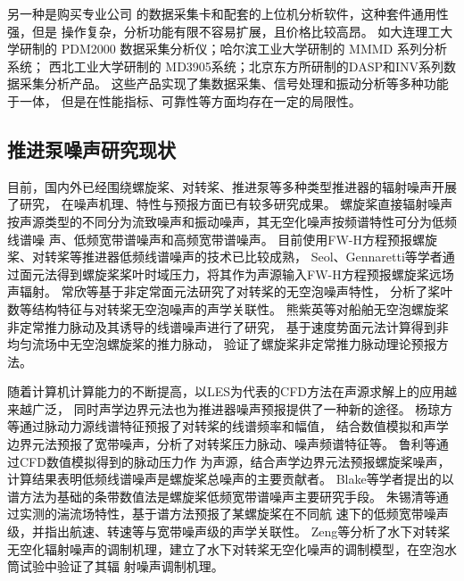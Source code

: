 另一种是购买专业公司
的数据采集卡和配套的上位机分析软件，这种套件通用性强，但是
操作复杂，分析功能有限不容易扩展，且价格比较高昂。
如大连理工大学研制的 PDM2000 数据采集分析仪；哈尔滨工业大学研制的 MMMD 系列分析系统；
西北工业大学研制的 MD3905系统；北京东方所研制的DASP和INV系列数据采集分析产品\cite{dingJi2014}。
这些产品实现了集数据采集、信号处理和振动分析等多种功能于一体，
但是在性能指标、可靠性等方面均存在一定的局限性。

\subsection{推进泵噪声研究现状}
目前，国内外已经围绕螺旋桨、对转桨、推进泵等多种类型推进器的辐射噪声开展了研究，
在噪声机理、特性与预报方面已有较多研究成果。
螺旋桨直接辐射噪声按声源类型的不同分为流致噪声和振动噪声，其无空化噪声按频谱特性可分为低频线谱噪
声、低频宽带谱噪声和高频宽带谱噪声\cite{cheng2019,xuye2019a}。
目前使用FW-H方程预报螺旋桨、对转桨等推进器低频线谱噪声的技术已比较成熟，
Seol、Gennaretti等学者通过面元法得到螺旋桨桨叶时域压力，将其作为声源输入FW-H方程预报螺旋桨远场声辐射\cite{seol2002,gennaretti2012}。
常欣等\cite{changxin2018}基于非定常面元法研究了对转桨的无空泡噪声特性，
分析了桨叶数等结构特征与对转桨无空泡噪声的声学关联性。
熊紫英等\cite{xiong2014}对船舶无空泡螺旋桨非定常推力脉动及其诱导的线谱噪声进行了研究，
基于速度势面元法计算得到非均匀流场中无空泡螺旋桨的推力脉动，
验证了螺旋桨非定常推力脉动理论预报方法。

随着计算机计算能力的不断提高，以LES为代表的CFD方法在声源求解上的应用越来越广泛，
同时声学边界元法也为推进器噪声预报提供了一种新的途径\cite{xuye2019a}。
杨琼方等\cite{__2016杨琼方}通过脉动力源线谱特征预报了对转桨的线谱频率和幅值，
结合数值模拟和声学边界元法预报了宽带噪声，分析了对转桨压力脉动、噪声频谱特征等。
鲁利等\cite{鲁利}通过CFD数值模拟得到的脉动压力作
为声源，结合声学边界元法预报螺旋桨噪声，计算结果表明低频线谱噪声是螺旋桨总噪声的主要贡献者。
Blake等学者提出的以谱方法为基础的条带数值法是螺旋桨低频宽带谱噪声主要研究手段\cite{1986Mechanics,jiang2020}。
朱锡清等\cite{朱锡清2006}通过实测的湍流场特性，基于谱方法预报了某螺旋桨在不同航
速下的低频宽带噪声级，并指出航速、转速等与宽带噪声级的声学关联性。
Zeng等\cite{zeng2017,zeng2020a}分析了水下对转桨无空化辐射噪声的调制机理，建立了水下对转桨无空化噪声的调制模型，在空泡水筒试验中验证了其辐
射噪声调制机理。

